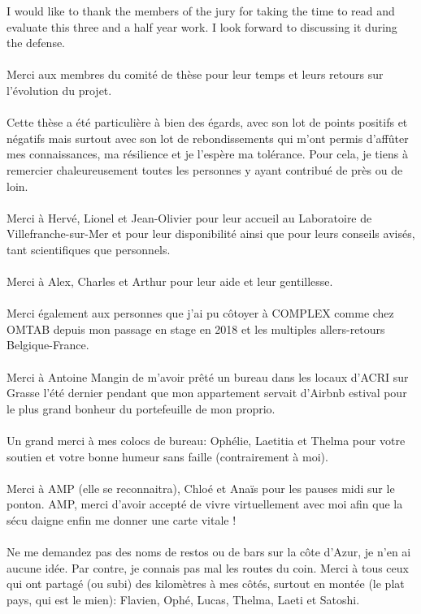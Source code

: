 \documentclass[a4paper]{report}
\begin{document}
I would like to thank the members of the jury for taking the time to read and evaluate this three and a half year work. I look forward to discussing it during the defense.\\
\\
Merci aux membres du comité de thèse pour leur temps et leurs retours sur l'évolution du projet.\\
\\
Cette thèse a été particulière à bien des égards, avec son lot de points positifs et négatifs mais surtout avec son lot de rebondissements qui m'ont permis d'affûter mes connaissances, ma résilience et je l'espère ma tolérance. Pour cela, je tiens à remercier chaleureusement toutes les personnes y ayant contribué de près ou de loin.\\
\\
Merci à Hervé, Lionel et Jean-Olivier pour leur accueil au Laboratoire de Villefranche-sur-Mer et pour leur disponibilité ainsi que pour leurs conseils avisés, tant scientifiques que personnels.\\
\\
Merci à Alex, Charles et Arthur pour leur aide et leur gentillesse.\\
\\
Merci également aux personnes que j'ai pu côtoyer à COMPLEX comme chez OMTAB depuis mon passage en stage en 2018 et les multiples allers-retours Belgique-France.\\
\\
Merci à Antoine Mangin de m'avoir prêté un bureau dans les locaux d'ACRI sur Grasse l'été dernier pendant que mon appartement servait d'Airbnb estival pour le plus grand bonheur du portefeuille de mon proprio.\\
\\
Un grand merci à mes colocs de bureau: Ophélie, Laetitia et Thelma pour votre soutien et votre bonne humeur sans faille (contrairement à moi).\\
\\
Merci à AMP (elle se reconnaitra), Chloé et Anaïs pour les pauses midi sur le ponton. AMP, merci d'avoir accepté de vivre virtuellement avec moi afin que la sécu daigne enfin me donner une carte vitale !\\
\\
Ne me demandez pas des noms de restos ou de bars sur la côte d'Azur, je n'en ai aucune idée. Par contre, je connais pas mal les routes du coin. Merci à tous ceux qui ont partagé (ou subi) des kilomètres à mes côtés, surtout en montée (le plat pays, qui est le mien): Flavien, Ophé, Lucas, Thelma, Laeti et Satoshi.\\
\end{document}
